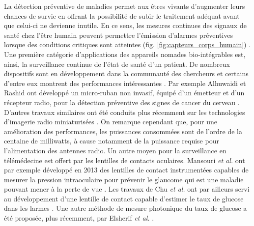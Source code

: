 La détection préventive de maladies permet aux êtres vivants d'augmenter leurs chances de survie en offrant la possibilité de subir le traitement adéquat avant que celui-ci ne devienne inutile. En ce sens, les mesures continues des signaux de santé chez l'être humain peuvent permettre l'émission d'alarmes préventives lorsque des conditions critiques sont atteintes (fig. \ref{fig:capteurs_corps_humain}) \cite{Abidi2020}. Une première catégorie d'applications des appareils nomades bio-intégrables est, ainsi, la surveillance continue de l'état de santé d'un patient. De nombreux dispositifs sont en développement dans la communauté des chercheurs et certains d'entre eux montrent des performances intéressantes \cite{Khan2010}. Par exemple Alhuwaidi et Rashid ont développé un micro-ruban non invasif, équipé d'un émetteur et d'un récepteur radio, pour la détection préventive des signes de cancer du cerveau \cite{Alhuwaidi2021}. D'autres travaux similaires ont été conduits plus récemment sur les technologies d'imagerie radio miniaturisées \cite{Yadav2020,Le2021,Smida2020}. On  remarque cependant que, pour une amélioration des performances, les puissances consommées sont de l'ordre de la centaine de milliwatts, à cause notamment de la puissance requise pour l'alimentation des antennes radio. Un autre moyen pour la surveillance en télémédecine est offert par les lentilles de contacts oculaires. Mansouri \emph{et al.} ont par exemple développé en 2013 des lentilles de contact instrumentées capables de mesurer la pression intraoculaire pour prévenir le glaucome qui est une maladie pouvant mener à la perte de vue \cite{Mansouri2013}. Les travaux de Chu \emph{et al.} ont par ailleurs servi au développement d'une lentille de contact capable d'estimer le taux de glucose dans les larmes \cite{Chu2011}. Une autre méthode de mesure photonique du taux de glucose a été proposée, plus récemment, par Elsherif \emph{et al.} \cite{Elsherif2018}. 
 
